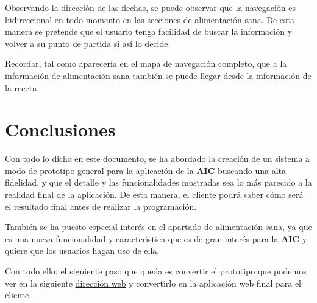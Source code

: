 \documentclass{\ClassPath/viu-tfm-template}
\begin{document}
Observando la dirección de las flechas, se puede observar que la navegación es bidireccional en todo momento en las secciones de alimentación sana. De esta manera se pretende que el usuario tenga facilidad de buscar la información y volver a su punto de partida si así lo decide.

Recordar, tal como aparecería en el mapa de navegación completo, que a la información de alimentación sana también se puede llegar desde la información de la receta.


\chapter{Conclusiones}

Con todo lo dicho en este documento, se ha abordado la creación de un sistema a modo de prototipo general para la aplicación de la \textbf{AIC} buscando una alta fidelidad, y que el detalle y las funcionalidades mostradas sea lo más parecido a la realidad final de la aplicación. De esta manera, el cliente podrá saber cómo será el resultado final antes de realizar la programación.

También se ha puesto especial interés en el apartado de alimentación sana, ya que es una nueva funcionalidad y característica que es de gran interés para la \textbf{AIC} y quiere que los usuarios hagan uso de ella.

Con todo ello, el siguiente paso que queda es convertir el prototipo que podemos ver en la siguiente \href{https://yuki.github.io/VIU_03MASW/preview.html}{dirección web} y convertirlo en la aplicación web final para el cliente.


\end{document}

